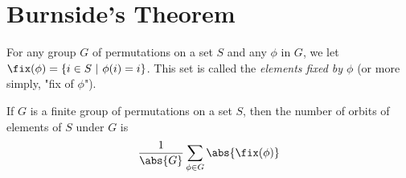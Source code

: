\section{Burnside's Theorem}

\begin{definition}
	For any group $G$ of permutations on a set $S$ and any $\phi$ in $G$, we let $\fix(\phi) = \{i \in S\ \vert\ \phi(i)=i\}$. This set is called the \textit{elements fixed by $\phi$} (or more simply, "fix of $\phi$").
\end{definition}

\begin{theorem}
	If $G$ is a finite group of permutations on a set $S$, then the number of orbits of elements of $S$ under $G$ is
	\[ \frac{1}{\abs{G}}\sum_{\phi \in G}\abs{\fix(\phi)} \]
\end{theorem}
